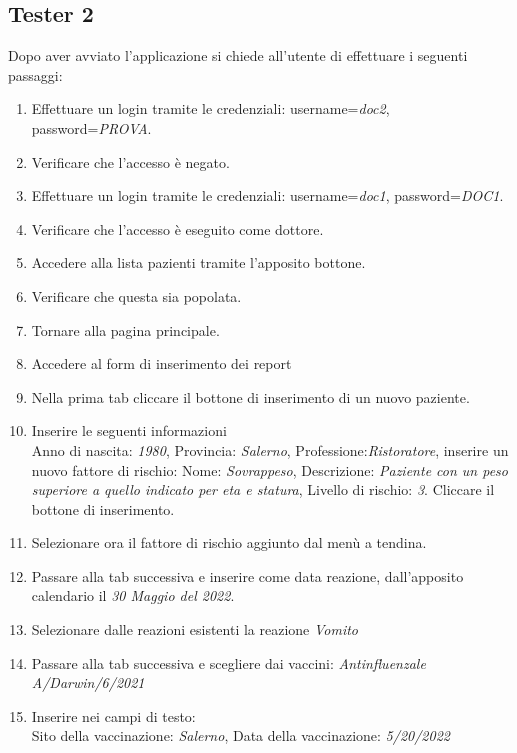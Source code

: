 \documentclass{article}
\begin{document}
    \subsection*{Tester 2}
    Dopo aver avviato l'applicazione si chiede all'utente di effettuare i seguenti passaggi:
    \begin{enumerate}
        \item Effettuare un login tramite le credenziali: username=\textit{doc2}, password=\textit{PROVA}.
        \item Verificare che l'accesso è negato.
        \item Effettuare un login tramite le credenziali: username=\textit{doc1}, password=\textit{DOC1}.
        \item Verificare che l'accesso è eseguito come dottore.
        \item Accedere alla lista pazienti tramite l'apposito bottone.
        \item Verificare che questa sia popolata.
        \item Tornare alla pagina principale.
        \item Accedere al form di inserimento dei report
        \item Nella prima tab cliccare il bottone di inserimento di un nuovo paziente.
        \item Inserire le seguenti informazioni\\
                Anno di nascita: \textit{1980}, Provincia: \textit{Salerno}, Professione:\textit{Ristoratore}, 
                inserire un nuovo fattore di rischio: Nome: \textit{Sovrappeso}, Descrizione: \textit{Paziente con un peso superiore a quello indicato per eta e statura}, Livello di rischio: \textit{3}. Cliccare il bottone di inserimento.
        \item Selezionare ora il fattore di rischio aggiunto dal menù a tendina.
        \item Passare alla tab successiva e inserire come data reazione, dall'apposito calendario il \textit{30 Maggio del 2022}.
        \item Selezionare dalle reazioni esistenti la reazione \textit{Vomito}
        \item Passare alla tab successiva e scegliere dai vaccini: \textit{Antinfluenzale A/Darwin/6/2021}
        \item Inserire nei campi di testo:\\
                Sito della vaccinazione: \textit{Salerno}, Data della vaccinazione: \textit{5/20/2022}

\end{enumerate}
\end{document}
